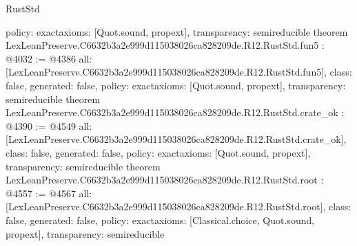 \begin{lexlean}{RustStd}
\begin{coremodule}
{  policy: exact{axioms: [Quot.sound, propext]},
  transparency: semireducible
}
theorem LexLeanPreserve.C6632b3a2e999d115038026ca828209de.R12.RustStd.fun5 : @4032 := @4386 {
  all: [LexLeanPreserve.C6632b3a2e999d115038026ca828209de.R12.RustStd.fun5],
  class: false,
  generated: false,
  policy: exact{axioms: [Quot.sound, propext]},
  transparency: semireducible
}
theorem LexLeanPreserve.C6632b3a2e999d115038026ca828209de.R12.RustStd.crate_ok : @4390 := @4549 {
  all: [LexLeanPreserve.C6632b3a2e999d115038026ca828209de.R12.RustStd.crate_ok],
  class: false,
  generated: false,
  policy: exact{axioms: [Quot.sound, propext]},
  transparency: semireducible
}
theorem LexLeanPreserve.C6632b3a2e999d115038026ca828209de.R12.RustStd.root : @4557 := @4567 {
  all: [LexLeanPreserve.C6632b3a2e999d115038026ca828209de.R12.RustStd.root],
  class: false,
  generated: false,
  policy: exact{axioms: [Classical.choice, Quot.sound, propext]},
  transparency: semireducible
}


\end{coremodule}
\end{lexlean}
